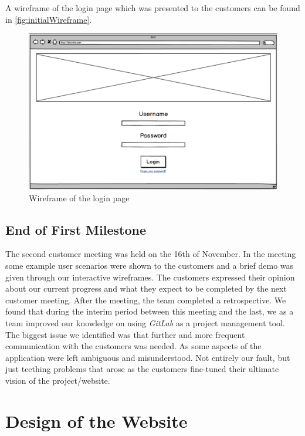 \documentclass{l3proj}
\begin{document}
A wireframe of the login page which was presented to the customers can be found in \autoref{fig:initialWireframe}.

\begin{figure}[ht]
\centerline{\includegraphics[width=\textwidth, height=\textheight, keepaspectratio]{wireframe.png}}
\caption{Wireframe of the login page}
\label{fig:initialWireframe}
\end{figure}

\subsection{End of First Milestone}
\label{sec:milestone1}

The second customer meeting was held on the 16th of November. In the meeting some example user scenarios were shown to the customers and a brief demo was given through our interactive wireframes. The customers expressed their opinion about our current progress and what they expect to be completed by the next customer meeting. After the meeting, the team completed a retrospective. We found that during the interim period between this meeting and the last, we as a team improved our knowledge on using \textit{GitLab} as a project management tool. The biggest issue we identified was that further and more frequent communication with the customers was needed. As some aspects of the application were left ambiguous and misunderstood. Not entirely our fault, but just teething problems that arose as the customers fine-tuned their ultimate vision of the project/website.

\section{Design of the Website}
\label{sec:design}
\end{document}
